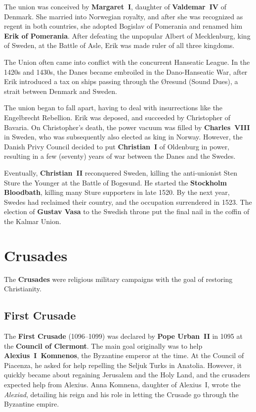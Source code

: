 The union was conceived by \textbf{Margaret~I}, daughter of \textbf{Valdemar~IV} of Denmark.
She married into Norwegian royalty, and after she was recognized as regent in both countries,
she adopted Bogislav of Pomerania and renamed him \textbf{Erik of Pomerania}.
After defeating the unpopular Albert of Mecklenburg, king of Sweden, at the Battle of Asle,
Erik was made ruler of all three kingdoms.

The Union often came into conflict with the concurrent Hanseatic League.
In the 1420s and 1430s, the Danes became embroiled in the Dano-Hanseatic War,
after Erik introduced a tax on ships passing through the \O{}resund (Sound Dues), a strait between Denmark and Sweden.

The union began to fall apart, having to deal with insurrections like the Engelbrecht Rebellion.
Erik was deposed, and succeeded by Christopher of Bavaria.
On Christopher's death, the power vacuum was filled by \textbf{Charles~VIII} in Sweden,
who was subsequently also elected as king in Norway.
However, the Danish Privy Council decided to put \textbf{Christian~I} of Oldenburg in power,
resulting in a few (seventy) years of war between the Danes and the Swedes.

Eventually, \textbf{Christian~II} reconquered Sweden,
killing the anti-unionist Sten Sture the Younger at the Battle of Bogesund.
He started the \textbf{Stockholm Bloodbath}, killing many Sture supporters in late 1520.
By the next year, Swedes had reclaimed their country, and the occupation surrendered in 1523.
The election of \textbf{Gustav Vasa} to the Swedish throne put the final nail in the coffin of the Kalmar Union.

\section{Crusades}

The \textbf{Crusades} were religious military campaigns with the goal of restoring Christianity.

\subsection*{First Crusade}

The \textbf{First Crusade} (1096--1099) was declared by \textbf{Pope Urban~II}
in 1095 at the \textbf{Council of Clermont}.
The main goal originally was to help \textbf{Alexius~I~Komnenos}, the Byzantine emperor at the time.
At the Council of Piacenza, he asked for help repelling the Seljuk Turks in Anatolia.
However, it quickly became about regaining Jerusalem and the Holy Land,
and the crusaders expected help from Alexius.
Anna Komnena, daughter of Alexius~I, wrote the \textit{Alexiad},
detailing his reign and his role in letting the Crusade go through the Byzantine empire.


